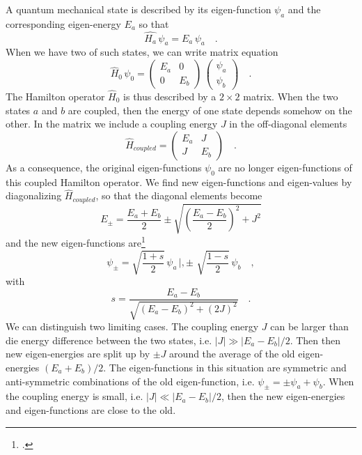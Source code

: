 A quantum mechanical state is described by its eigen-function $\psi_a$ and the corresponding eigen-energy $E_a$ so that 
\begin{equation}
\hat{H_a}  \, \psi_a = E_a  \,\psi_a  \quad .
\end{equation}
When we have two of such states, we can  write matrix equation
\begin{equation}
\hat{H}_0 \, \psi_0 = \begin{pmatrix}  E_a & 0 \\ 0 & E_b \end{pmatrix} \,
	 \begin{pmatrix}  \psi_ a\\ \psi_b\end{pmatrix}  \quad .
\end{equation}
The Hamilton operator $\hat{H}_0$ is thus described by a $2 \times 2$ matrix. When the two states $a$ and $b$ are coupled, then the energy of one state depends somehow on the other. In the matrix we include a coupling energy $J$ in the off-diagonal elements
\begin{equation}
\hat{H}_{coupled}  = \begin{pmatrix}  E_a & J \\ J & E_b \end{pmatrix} 
\quad . 
\end{equation}
As a consequence, the original eigen-functions $\psi_0$ are no longer eigen-functions of this coupled Hamilton operator. We find new eigen-functions and eigen-values by diagonalizing $\hat{H}_{coupled}$, so that the diagonal elements become
\begin{equation}
 E_\pm = \frac{E_a + E_b}{2} \pm \sqrt{ \left( \frac{E_a - E_b}{2} \right)^2 + J^2 }
\end{equation}
and the new  eigen-functions are\footcite[eq. 8.10]{Parson}
\begin{equation}
 \psi_{\pm} = 
\sqrt{\frac{1+s}{2}} \,  \psi_a \, |,  \pm \, \, \sqrt{\frac{1-s}{2}}  \, \psi_b \quad ,
\end{equation}
with
\begin{equation}
s = \frac{E_a - E_b}{\sqrt{(E_a - E_b)^2 + (2J)^2}} \quad .
\end{equation}
%
We can distinguish two limiting cases. The coupling energy $J$ can be larger than die energy difference between the two states, i.e. $|J| \gg |E_a - E_b| / 2$. Then then new eigen-energies are split up by $\pm J$ around the average of the old eigen-energies $(E_a + E_b) /2$. The eigen-functions in this situation are symmetric and anti-symmetric combinations of the old eigen-function, i.e. $\psi_\pm = \pm \psi_a + \psi_b$. When the coupling energy is small, i.e. $|J| \ll |E_a - E_b| / 2$, then the new eigen-energies and eigen-functions are close to the old.



